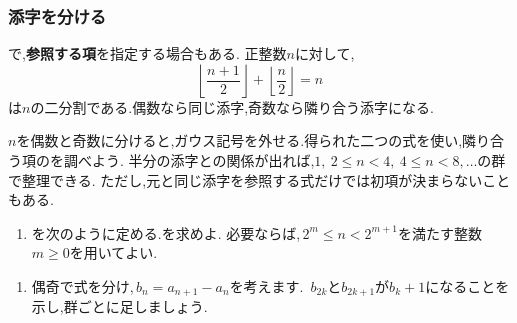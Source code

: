   \subsubsection{添字を分ける}\label{節：ガウス型の添字の分割}
    で,\textbf{参照する項}を指定する場合もある.
    正整数$n$に対して,
    \[
      \left\lfloor\frac{n+1}{2}\right\rfloor
      +\left\lfloor\frac n2\right\rfloor=n
    \]
    は$n$の二分割である.偶数なら同じ添字,奇数なら隣り合う添字になる.

    $n$を偶数と奇数に分けると,ガウス記号を外せる.得られた二つの式を使い,隣り合う項のを調べよう.
    半分の添字との関係が出れば,$1,\ 2\le n<4,\ 4\le n<8,\ldots$の群で整理できる.
    ただし,元と同じ添字を参照する式だけでは初項が決まらないこともある.

    \noindent {}\par\nobreak
    \begin{enumerate}[label=(\arabic*),parsep=3pt,beginpenalty=10000,format=\bookitemlink{example-gauss-role-7}{problem}{answer}]
      \item {}を次のように定める.を求めよ.
\BookMathLayout{            \[
              a_1=2,\qquad
              a_n=a_{\left\lfloor\frac{n+1}{2}\right\rfloor}
                  +a_{\left\lfloor\frac n2\right\rfloor}+n-1
              \quad(n\ge2).
            \]}{            \[
              \begin{aligned}
              a_1&=2,\\
              a_n&=a_{\left\lfloor\frac{n+1}{2}\right\rfloor}
                  +a_{\left\lfloor\frac n2\right\rfloor}+n-1
              \\              &\quad(n\ge2).
              \end{aligned}
            \]}
            必要ならば,\,$2^m\le n<2^{m+1}$を満たす整数$m\ge0$を用いてよい.
    \end{enumerate}

    \noindent {}\par\nobreak
    \begin{enumerate}[label=(\arabic*),parsep=3pt,beginpenalty=10000,format=\bookitemlink{example-gauss-role-7}{hint}{problem}]
      \item 偶奇で式を分け,\,$b_n=a_{n+1}-a_n$を考えます.
            \,$b_{2k}$と$b_{2k+1}$が$b_k+1$になることを示し,群ごとに足しましょう.
    \end{enumerate}


